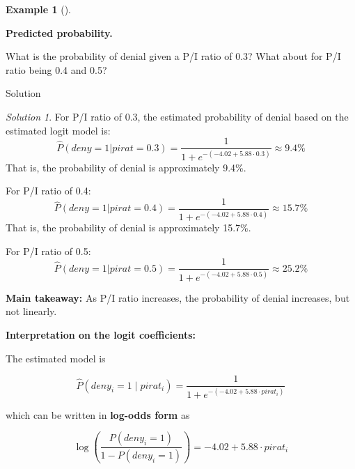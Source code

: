 \documentclass[
  12pt,
  letterpaper,
]{scrbook}
\theoremstyle{definition}
\newtheorem{example}{Example}[chapter]
\theoremstyle{plain}
\theoremstyle{remark}
\newtheorem{refsolution}{Solution}[chapter]
\begin{document}
\begin{example}[]\protect\hypertarget{exm-1}{}\label{exm-1}

\textbf{Predicted probability.}

What is the probability of denial given a P/I ratio of 0.3? What about
for P/I ratio being 0.4 and 0.5?

\end{example}

Solution

\begin{refsolution}
For P/I ratio of 0.3, the estimated probability of denial based on the
estimated logit model is: \[
\widehat{P}(deny = 1 | pirat = 0.3) = \frac{1}{1 + e^{-(-4.02 + 5.88 \cdot 0.3)}} \approx 9.4\%
\] That is, the probability of denial is approximately 9.4\%.

For P/I ratio of 0.4: \[
\widehat{P}(deny = 1 | pirat = 0.4) = \frac{1}{1 + e^{-(-4.02 + 5.88 \cdot 0.4)}} \approx 15.7\%
\] That is, the probability of denial is approximately 15.7\%.

For P/I ratio of 0.5: \[
\widehat{P}(deny = 1 | pirat = 0.5) = \frac{1}{1 + e^{-(-4.02 + 5.88 \cdot 0.5)}} \approx 25.2\%
\]

\textbf{Main takeaway:} As P/I ratio increases, the probability of
denial increases, but not linearly.

\label{sol-1}

\end{refsolution}

{\textbf{Interpretation on the logit coefficients:}}

The estimated model is

\[
\widehat{P}(deny_i = 1 \mid pirat_i) = \frac{1}{1 + e^{-(-4.02 + 5.88 \cdot pirat_i)}}
\]

which can be written in \textbf{log-odds form} as

\[
\log\left(\frac{P(deny_i = 1)}{1 - P(deny_i = 1)}\right) = -4.02 + 5.88 \cdot pirat_i
\]
\end{document}

